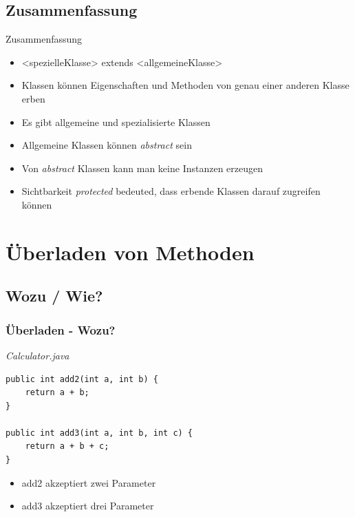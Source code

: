 \documentclass[18pt]{beamer}
\begin{document}
\subsection{Zusammenfassung}
\begin{frame}{Zusammenfassung}
	\begin{itemize}
		\item <spezielleKlasse> extends <allgemeineKlasse>
		\item Klassen können Eigenschaften und Methoden von genau einer anderen Klasse erben
		\item Es gibt allgemeine und spezialisierte Klassen \pause
		\item Allgemeine Klassen können \emph{abstract} sein
		\item Von \emph{abstract} Klassen kann man keine Instanzen erzeugen \pause
		\item Sichtbarkeit \emph{protected} bedeuted, dass erbende Klassen darauf zugreifen können
	\end{itemize}
\end{frame}


\section{Überladen von Methoden}
\subsection{Wozu / Wie?}
\begin{frame}[containsverbatim]
	\frametitle{Überladen - Wozu?}
	
	\emph{Calculator.java}
	\begin{lstlisting}
public int add2(int a, int b) {
	return a + b;
}

public int add3(int a, int b, int c) {
	return a + b + c;
}
	\end{lstlisting}

	\begin{itemize}
		\item add2 akzeptiert zwei Parameter
		\item add3 akzeptiert drei Parameter
	\end{itemize}		
\end{frame}
\end{document}

